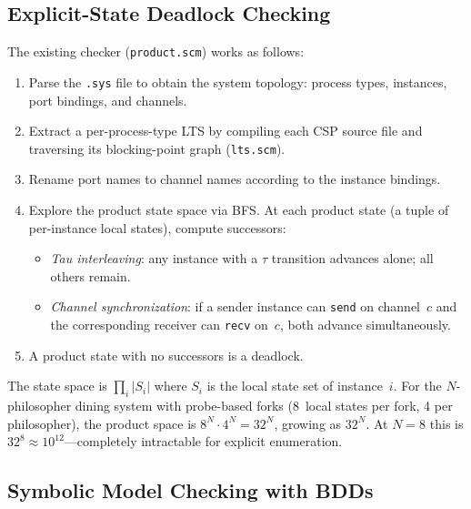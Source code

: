 \documentclass[11pt]{article}
\begin{document}
\subsection{Explicit-State Deadlock Checking}

The existing checker (\texttt{product.scm}) works as follows:

\begin{enumerate}
\item Parse the \texttt{.sys} file to obtain the system topology:
      process types, instances, port bindings, and channels.
\item Extract a per-process-type LTS by compiling each CSP source file
      and traversing its blocking-point graph (\texttt{lts.scm}).
\item Rename port names to channel names according to the instance bindings.
\item Explore the product state space via BFS.  At each product state
      (a tuple of per-instance local states), compute successors:
      \begin{itemize}
        \item \emph{Tau interleaving}: any instance with a $\tau$ transition
              advances alone; all others remain.
        \item \emph{Channel synchronization}: if a sender instance can
              \texttt{send} on channel~$c$ and the corresponding receiver
              can \texttt{recv} on~$c$, both advance simultaneously.
      \end{itemize}
\item A product state with no successors is a deadlock.
\end{enumerate}

The state space is $\prod_{i} |S_i|$ where $S_i$ is the local state
set of instance~$i$.  For the $N$-philosopher dining system with
probe-based forks (8~local states per fork, 4 per philosopher), the
product space is $8^N \cdot 4^N = 32^N$, growing as $32^N$.  At
$N=8$ this is $32^8 \approx 10^{12}$---completely intractable for
explicit enumeration.

\subsection{Symbolic Model Checking with BDDs}
\end{document}
